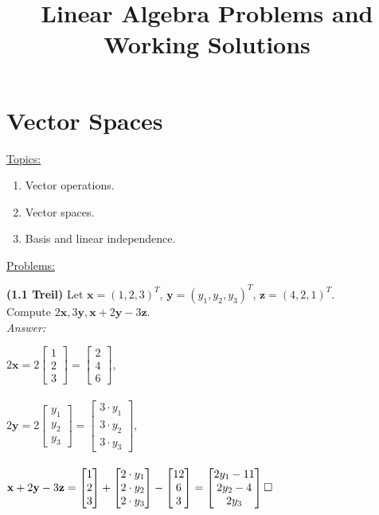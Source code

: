 \documentclass{book}
\title{Linear Algebra Problems and Working Solutions}
\date{}
\renewcommand{\vec}[1]{\mathbf{#1}}
\begin{document}
	\maketitle
	\chapter{Vector Spaces}
	\underline{Topics:}
	\begin{enumerate}
		\item Vector operations.
		\item Vector spaces.
		\item Basis and linear independence.
	\end{enumerate}	
	\underline{Problems:}
	
	\noindent\textbf{(1.1 Treil)}
	Let $\vec{x} = (1,2,3)^T$,
	$\vec{y} = (y_1,y_2,y_3)^T$, 
	$\vec{z} = (4,2,1)^T.$ 
	\\Compute $2\vec{x}, 3\vec{y}, \vec{x}+2\vec{y}-3\vec{z}.$  	
	\\\textit{Answer:}
	
	$
	2\vec{x}=2 
	\begin{bmatrix}
	1\\2\\3
	\end{bmatrix}
	= \begin{bmatrix}
	2\\4\\6
	\end{bmatrix}
	$,\\\\

	$
	2\vec{y}=2 
	\begin{bmatrix}
	y_1\\y_2\\y_3
	\end{bmatrix}
	= \begin{bmatrix}
	3\cdot y_1\\3\cdot y_2\\3\cdot y_3
	\end{bmatrix}
	$,\\\\

	$
	\vec{x}+2\vec{y}-3\vec{z}= 
	\begin{bmatrix}
	1\\2\\3
	\end{bmatrix}+
	\begin{bmatrix}
	2\cdot y_1\\2\cdot y_2\\2\cdot y_3
	\end{bmatrix}-
	\begin{bmatrix}
	12\\6\\3
	\end{bmatrix}=
	\begin{bmatrix}
	2y_1-11\\2y_2-4\\2y_3
	\end{bmatrix}
	\\\square $\\\\
\end{document}
